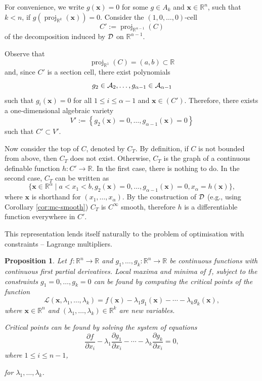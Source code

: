 \documentclass[
]{book}
\newtheorem{proposition}{Proposition}[chapter]
\theoremstyle{definition}
\theoremstyle{definition}
\theoremstyle{definition}
\theoremstyle{definition}
\theoremstyle{remark}
\begin{document}
For convenience, we write \(g(\mathbf{x}) = 0\) for some \(g \in A_k\) and \(\mathbf{x} \in \mathbb{R}^n\), such that \(k < n\), if \(g({\operatorname{proj}_{\mathbb{R}^{k}}}(\mathbf{x})) = 0\).
Consider the \((1,0,\ldots,0)\)-cell
\[
C' := {\operatorname{proj}_{\mathbb{R}^{\alpha - 1}}}(C)
\]
of the decomposition induced by \(\cal D\) on \(\mathbb{R}^{\alpha - 1}\).

Observe that
\[
{\operatorname{proj}_{\mathbb{R}^{1}}}(C) = (a,b) \subset \mathbb{R}
\]
and, since \(C'\) is a section cell, there exist polynomials
\[
g_2 \in {\cal A}_2,\ldots,g_{\alpha - 1} \in {\cal A}_{\alpha - 1}
\] such that \(g_i(\mathbf{x}) = 0\) for all \(1\le i \le \alpha - 1\) and \(\mathbf{x} \in (C')\).
Therefore, there exists a one-dimensional algebraic variety
\[
V' := \left\{ g_2(\mathbf{x}) = 0, \ldots, g_{\alpha - 1}(\mathbf{x}) = 0 \right\}
\]
such that \(C' \subset V'\).

Now consider the top of \(C\), denoted by \(C_T\).
By definition, if \(C\) is not bounded from above, then \(C_T\) does not exist. Otherwise, \(C_T\) is the graph of a continuous definable function \(h : C' \to \mathbb{R}\).
In the first case, there is nothing to do.
In the second case, \(C_T\) can be written as
\begin{equation}
\{ \mathbf{x} \in \mathbb{R}^\alpha \mid a < x_1 < b, g_2(\mathbf{x}) = 0, \ldots, g_{\alpha - 1}(\mathbf{x}) = 0, x_\alpha = h(\mathbf{x}) \},
\label{eq:c-alpha-top}
\end{equation}
where \(\mathbf{x}\) is shorthand for \((x_1,\ldots,x_\alpha)\).
By the construction of \(\cal D\) (e.g., using Corollary \ref{cor:mc-smooth}) \(C_T\) is \(C^\infty\) smooth, therefore \(h\) is a differentiable function everywhere in \(C'\).

This representation lends itself naturally to the problem of optimisation with constraints -- Lagrange multipliers.

\begin{proposition}
\protect\hypertarget{prp:lagrange-multipliers}{}\label{prp:lagrange-multipliers}Let \(f : \mathbb{R}^n \to \mathbb{R}\) and \(g_1,\ldots,g_k : \mathbb{R}^n \to \mathbb{R}\) be continuous functions with continuous first partial derivatives.
Local maxima and minima of \(f\), subject to the constraints \(g_1=0,\ldots,g_k=0\) can be found by computing the critical points of the function
\[
\mathcal{L}(\mathbf{x}, \lambda_1,\ldots,\lambda_k) = f(\mathbf{x}) - \lambda_1 g_1(\mathbf{x}) - \cdots - \lambda_k g_k(\mathbf{x}),
\]
where \(\mathbf{x} \in \mathbb{R}^n\) and \((\lambda_1,\ldots,\lambda_k) \in \mathbb{R}^k\) are new variables.

Critical points can be found by solving the system of equations
\begin{equation}
\dfrac{\partial f}{\partial x_i} - \lambda_1 \dfrac{\partial g_1}{\partial x_i} - \cdots - \lambda_k \dfrac{\partial g_k}{\partial x_i}= 0,
\label{eq:lagrange}
\end{equation}
where \(1\le i \le n-1\),

for \(\lambda_1,\ldots,\lambda_k\).
\end{proposition}
\end{document}

